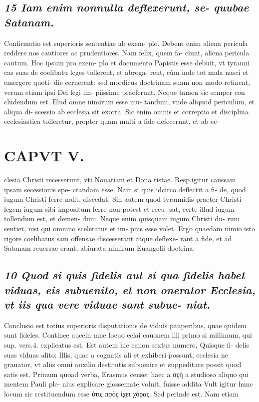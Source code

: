 \documentclass{article}
\begin{document}
\begin{pages}
\subsection*{\textit{15 Iam enim nonnulla deflexerunt, se- quubae Satanam. }}\pstart Confirmatio est superioris sententiae ab exem- plo. Debent enim aliena pericula reddere nos cautiores ac prudentiores. Nam felix, quem fa- ciunt, aliena pericula cautum. Hoc ipsum pro exem- plo et documento Papistis esse debuit, vt tyranni cas suas de coelibatu leges tollerent, et abroga- rent, cùm inde tot mala nasci et emergere quoti- die cernerent: sed mordicus doctrinam suam non modo retinent, verum etiam ipsi Dei legi im- piissime praeferunt. Neque tamen sic semper con cludendum est. Illud omne nimirum esse mu- tandum, vnde aliquod periculum, et aliqua di- scessio ab ecclesia sit exorta. Sic enim omnis et correptio et disciplina ecclesiastica tolleretur, propter quam multi a fide defecerunt, et ab ec-  \pend
\section*{CAPVT  V. }
\marginpar{[ p.301 ]}\pstart clesia Christi recesserunt, vti Nouatiani et Dona tistae. Resp.igitur caussam ipsam secessionis spe- ctandam esse. Nam si quis idcirco deflectit a fi- de, quod iugum Christi ferre nolit, discedat. Sin autem quod tyrannidis praeter Christi legem iugum sibi impositum ferre non potest et recu- sat, certe illud iugum tollendum est, et demen- dum. Neque enim quisquam iugum Christi du- rum sentiet, nisi qui omnino sceleratus et im- pius esse volet. Ergo quaedam nimio isto rigore coelibatus sam offensae discesserant atque deflexe- rant a fide, et ad Satanam reuersae erant, abiurata nimirum Euangelii doctrina.  \pend
{}
{}
\subsection*{\textit{10 Quod si quis fidelis aut si qua fidelis habet viduas, eis subuenito, et non onerator Ecclesia, vt iis qua vere viduae sant subue- niat. }}\pstart Conclusio est totius superioris disputationis de viduis pauperibus, quae quidem sunt fideles. Continee aucein mne loeuo eclai cauonem illi primo si millimum, qui sup. vers.4. explicatus est. Est autem hic canon sextus numero, Quisque fi- delis suas viduas alito: Illis, quae a cognatis ali et exhiberi possunt, ecclesia ne grauator, vt aliis omni auxilio destitutis subuenire et suppeditare possit quod satis est.  \pend\pstart Primum quoad verba, Erasmus censet haec a σςὴ a studioso aliquo qui mentem Pauli ple- nius explicare glossemate voluit, fuisse addita Vult igitur hunc locum sic restituendum esse ὐτις πσὸς ἰχει χόρας. Sed perinde est. Nam etiam  \pend

\end{pages}
\end{document}
